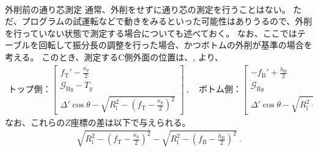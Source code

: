 \clearpage
~\vfill
\begin{Column}{外削前の通り芯測定}
通常、外削をせずに通り芯の測定を行うことはない。
ただ、プログラムの試運転などで動きをみるといった可能性はありうるので、外削を行っていない状態で測定する場合についても述べておく。
なお、ここではテーブルを回転して振分長の調整を行った場合、かつボトムの外削が基準の場合を考える。
このとき、測定するC側外面の位置は、, より、
\begin{align*}
  \text{トップ側：}
  \left[
    \begin{array}{c}
      \displaystyle f_\mathrm T'-\frac{\kappa_p}2\\[5pt]
      \mathcal G_{\mathrm By}-T_y\\[3pt]
      \displaystyle \varDelta'\!\cos\theta-\sqrt{R_\mathrm i^2-\left(f_\mathrm T-\frac{\kappa_p}2\right)^{\!\!2}}
    \end{array}
  \right]~, \quad
  \text{ボトム側：}
  \left[
    \begin{array}{c}
      \displaystyle -f_\mathrm B'+\frac{h_\mathrm B}2\\[5pt]
      \mathcal G_{\mathrm By}\\[3pt]
      \displaystyle \varDelta'\!\cos\theta-\sqrt{R_\mathrm i^2-\left(f_\mathrm B-\frac{h_\mathrm B}2\right)^{\!\!2}}
    \end{array}
    \right].
\end{align*}
なお、これらの$Z$座標の差は以下で与えられる。
\begin{align*}
  \sqrt{R_\mathrm i^2-\left(f_\mathrm T-\frac{\kappa_p}2\right)^{\!\!2}}
  -\sqrt{R_\mathrm i^2-\left(f_\mathrm B-\frac{h_\mathrm B}2\right)^{\!\!2}}~.
\end{align*}
\end{Column}
